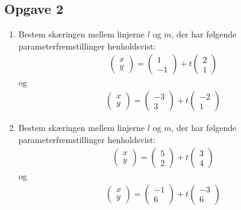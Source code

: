\subsection*{Opgave 2}
\begin{enumerate}[label=\roman*)]

\item Bestem skæringen mellem linjerne $l$ og $m$, der har følgende parameterfremstillinger henholdsvist:
\begin{align*}
\begin{pmatrix}
x \\ y
\end{pmatrix}
= 
\begin{pmatrix}
1 \\ -1
\end{pmatrix}
+
t
\begin{pmatrix}
2 \\ 1
\end{pmatrix}
\end{align*}
og 
\begin{align*}
\begin{pmatrix}
x \\ y
\end{pmatrix}
= 
\begin{pmatrix}
-3 \\ 3
\end{pmatrix}
+
t
\begin{pmatrix}
-2 \\ 1
\end{pmatrix}
\end{align*}

\item Bestem skæringen mellem linjerne $l$ og $m$, der har følgende parameterfremstillinger henholdsvist:
\begin{align*}
\begin{pmatrix}
x \\ y
\end{pmatrix}
= 
\begin{pmatrix}
5 \\ 2
\end{pmatrix}
+
t
\begin{pmatrix}
3 \\ 4
\end{pmatrix}
\end{align*}
og 
\begin{align*}
\begin{pmatrix}
x \\ y
\end{pmatrix}
= 
\begin{pmatrix}
-1 \\ 6
\end{pmatrix}
+
t
\begin{pmatrix}
-3 \\ 6
\end{pmatrix}
\end{align*}

\end{enumerate}


